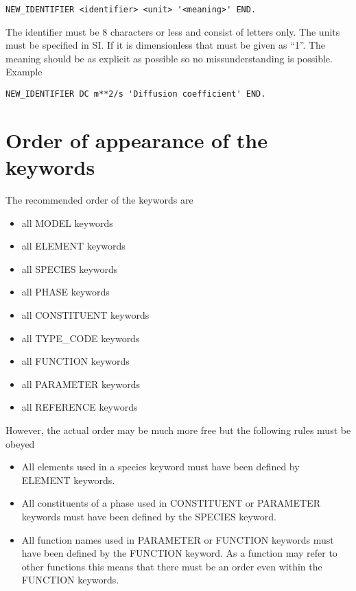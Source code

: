 \documentclass[12pt]{article}
\begin{document}
\begin{verbatim}
NEW_IDENTIFIER <identifier> <unit> '<meaning>' END.
\end{verbatim}

The identifier must be 8 characters or less and consist of letters
only. The units must be specified in SI. If it is dimensionless that
must be given as ``1''. The meaning should be as explicit as possible
so no missunderstanding is possible. Example

\begin{verbatim}
NEW_IDENTIFIER DC m**2/s 'Diffusion coefficient' END.
\end{verbatim}

\section{Order of appearance of the keywords}

The recommended order of the keywords are

\begin{itemize}
\item all MODEL keywords
\item all ELEMENT keywords
\item all SPECIES keywords
\item all PHASE keywords
\item all CONSTITUENT keywords
\item all TYPE\_CODE keywords
\item all FUNCTION keywords
\item all PARAMETER keywords
\item all REFERENCE keywords
\end{itemize}

However, the actual order may be much more free but the following
rules must be obeyed

\begin{itemize}
\item All elements used in a species keyword 
must have been defined by ELEMENT keywords.
\item All constituents of a phase used in CONSTITUENT or PARAMETER keywords
must have been defined by the SPECIES keyword.
\item All function names used in PARAMETER or FUNCTION keywords
must have been defined by the FUNCTION keyword. As a function may refer to 
other functions this means that there must be an order even within
the FUNCTION keywords.
\end{itemize}
\end{document}
